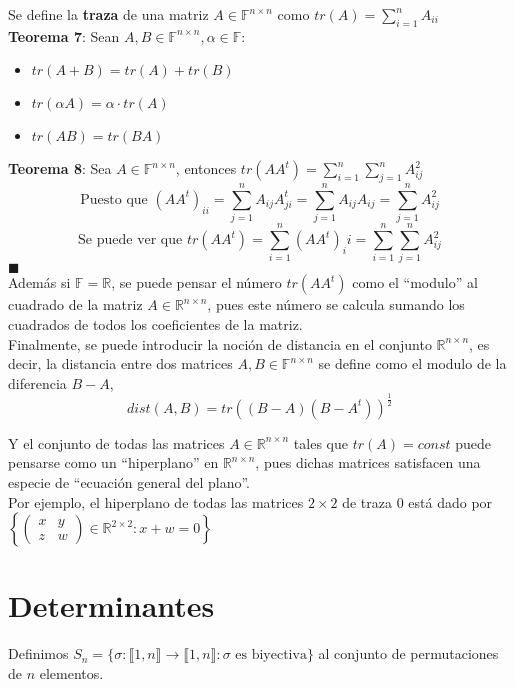 \documentclass[11pt,a4paper]{article}
\newcommand*{\QEDA}{\null\nobreak\hfill\ensuremath{\blacksquare}}
\begin{document}
Se define la \textbf{traza} de una matriz $A \in \mathbb{F}^{n \times n}$ como $tr(A) = \sum_{i=1}^n A_{ii}$\\
\textbf{Teorema 7}: Sean $A,B \in \mathbb{F}^{n \times n}, \alpha \in \mathbb{F}$:
\begin{itemize}
\itemsep-0.3em
\item $tr(A + B) = tr(A) + tr(B)$
\item $tr(\alpha A) = \alpha \cdot tr(A)$
\item $tr(AB) = tr(BA)$
\end{itemize}

\textbf{Teorema 8}: Sea $A \in \mathbb{F}^{n \times n}$, entonces $\displaystyle{tr(AA^t) = \sum_{i=1}^n \sum_{j=1}^n A^2_{ij}}$\\
$$\text{Puesto que  }(AA^t)_{ii} = \sum_{j = 1}^n A_{ij} A^t_{ji} = \sum_{j=1}^n A_{ij}A_{ij} = \sum_{j=1}^n A_{ij}^2$$
$$\text{Se puede ver que  } tr(AA^t) = \sum_{i=1}^n(AA^t)_ii = \sum_{i=1}^n \sum_{j=1}^n A_{ij}^2$$
\QEDA\\

Adem\'as si $\mathbb{F} = \mathbb{R}$, se puede pensar el n\'umero $tr(AA^t)$ como el ``modulo'' al cuadrado de la matriz $A \in \mathbb{R}^{n \times n}$, pues este n\'umero se calcula sumando los cuadrados de todos los coeficientes de la matriz.\\ Finalmente, se puede  introducir la noci\'on de distancia en el conjunto $\mathbb{R}^{n \times n}$, es decir, la distancia entre dos matrices $A,B \in \mathbb{F}^{n \times n}$ se define como el modulo de la diferencia $B - A$, 
$$dist(A,B) = tr((B-A)(B-A^t))^{\frac{1}{2}}$$

Y el conjunto de todas las matrices $A \in \mathbb{R}^{n \times n}$ tales que $tr(A) = const$ puede pensarse como un ``hiperplano'' en $\mathbb{R}^{n \times n}$, pues dichas matrices satisfacen una especie de ``ecuaci\'on general del plano''. \\

 Por ejemplo, el hiperplano de todas las matrices $2 \times 2$ de traza 0 est\'a dado por $\left\{ \begin{pmatrix} x & y \\ z & w \end{pmatrix} \in \mathbb{R}^{2 \times 2} : x+w = 0 \right\}$

\newpage

\section{Determinantes}
Definimos $S_n = \{ \sigma : \llbracket 1,n \rrbracket \rightarrow \llbracket 1,n \rrbracket : \sigma \text{ es biyectiva} \}$ al conjunto de permutaciones de $n$ elementos.
\end{document}
